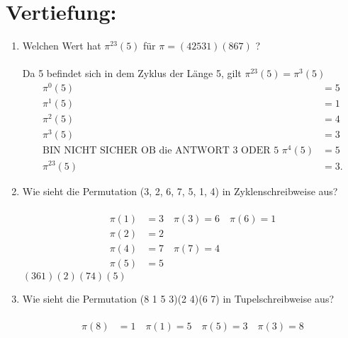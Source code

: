 



    \maketitle
    \section*{Vertiefung:}
    \begin{enumerate}[label=(\alph*)]
        \item Welchen Wert hat $\pi^{23}(5)$ f\"ur $\pi=(4 2 5 3 1)(8 6 7)$ ?\\\\
        Da 5 befindet sich in dem Zyklus der Länge 5, gilt $\pi^{23}(5)=\pi^{3}(5)$
        \\
               \begin{align*}
        \pi^{0}(5) &= 5\\
        \pi^1(5) &= 1 \\
        \pi^2(5) &= 4\\
        \pi^3(5) &= 3\\
        \textrm {BIN NICHT  SICHER OB die ANTWORT 3 ODER 5 } \pi^4(5) &= 5\\
        \pi^{23}(5)&=3.
               \end{align*}
        \item Wie sieht die Permutation (3, 2, 6, 7, 5, 1, 4) in Zyklenschreibweise aus?\\\\
              \begin{align*}
              \pi(1) &= 3 \quad \pi(3)=6 \quad \pi(6)=1 \\
              \pi(2) &= 2\\
              \pi(4) &= 7 \quad \pi(7)=4 \\
              \pi(5) &= 5  
              \end{align*}
        $(361)(2)(74)(5)$
        \item Wie sieht die Permutation (8 1 5 3)(2 4)(6 7) in Tupelschreibweise aus?\\\\
        \begin{align*}
        	\pi(8) &=1 \quad \pi(1)= 5 \quad \pi(5)=3 \quad \pi(3)=8\\

\end{align*}
\end{enumerate}
